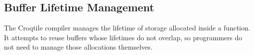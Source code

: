 \subsection*{Buffer Lifetime Management}

The Croqtile compiler manages the lifetime of storage allocated inside a function. It attempts to reuse buffers whose lifetimes do not overlap, so programmers do not need to manage those allocations themselves.
